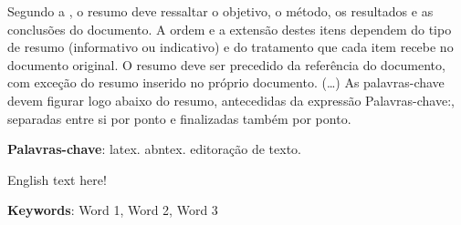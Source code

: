 %
%

\begin{RESUMO}
    \thispagestyle{empty}

    \noindent Segundo a , o resumo deve ressaltar o
    objetivo, o método, os resultados e as conclusões do documento. A ordem e a extensão
    destes itens dependem do tipo de resumo (informativo ou indicativo) e do
    tratamento que cada item recebe no documento original. O resumo deve ser
    precedido da referência do documento, com exceção do resumo inserido no
    próprio documento. (\ldots) As palavras-chave devem figurar logo abaixo do
    resumo, antecedidas da expressão Palavras-chave:, separadas entre si por
    ponto e finalizadas também por ponto.

    \vspace*{0.5cm}\noindent\textbf{Palavras-chave}: latex. abntex. editoração de texto.

\end{RESUMO}


% 
%

\begin{ABSTRACT}
	
		\noindent English text here!

		\vspace*{0.5cm}\noindent\textbf{Keywords}: Word 1, Word 2, Word 3
		
\end{ABSTRACT}
